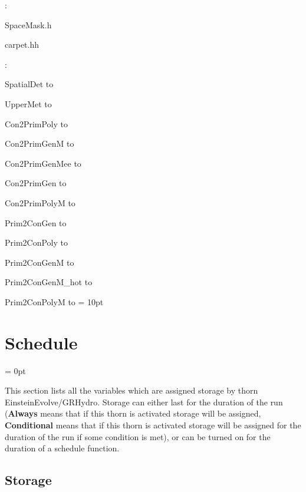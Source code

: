 \documentclass{article}
\begin{document}
\vspace{5mm}

: 

SpaceMask.h

carpet.hh
\vspace{2mm}

: 



SpatialDet to 

UpperMet to 

Con2PrimPoly to 

Con2PrimGenM to 

Con2PrimGenMee to 

Con2PrimGen to 

Con2PrimPolyM to 

Prim2ConGen to 

Prim2ConPoly to 

Prim2ConGenM to 

Prim2ConGenM\_hot to 

Prim2ConPolyM to 
\vspace{2mm}\parskip = 10pt 

\section{Schedule} 


\parskip = 0pt


\noindent This section lists all the variables which are assigned storage by thorn EinsteinEvolve/GRHydro.  Storage can either last for the duration of the run ({\bf Always} means that if this thorn is activated storage will be assigned, {\bf Conditional} means that if this thorn is activated storage will be assigned for the duration of the run if some condition is met), or can be turned on for the duration of a schedule function.


\subsection*{Storage}

\hspace{5mm}
\end{document}

